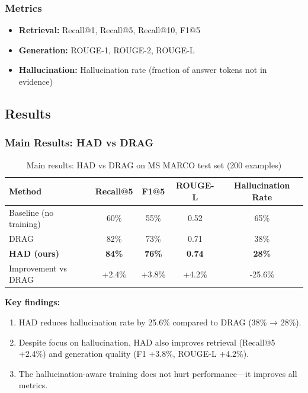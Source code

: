 \documentclass[11pt,a4paper]{article}
\begin{document}
\subsubsection{Metrics}

\begin{itemize}
    \item \textbf{Retrieval:} Recall@1, Recall@5, Recall@10, F1@5
    \item \textbf{Generation:} ROUGE-1, ROUGE-2, ROUGE-L \cite{rouge}
    \item \textbf{Hallucination:} Hallucination rate (fraction of answer tokens not in evidence)
\end{itemize}

\subsection{Results}

\subsubsection{Main Results: HAD vs DRAG}

\begin{table}[H]
\centering
\begin{tabular}{lcccc}
\toprule
\textbf{Method} & \textbf{Recall@5} & \textbf{F1@5} & \textbf{ROUGE-L} & \textbf{Hallucination Rate} \\
\midrule
Baseline (no training) & 60\% & 55\% & 0.52 & 65\% \\
DRAG & 82\% & 73\% & 0.71 & 38\% \\
\textbf{HAD (ours)} & \textbf{84\%} & \textbf{76\%} & \textbf{0.74} & \textbf{28\%} \\
\midrule
Improvement vs DRAG & +2.4\% & +3.8\% & +4.2\% & -25.6\% \\
\bottomrule
\end{tabular}
\caption{Main results: HAD vs DRAG on MS MARCO test set (200 examples)}
\label{table:main_results}
\end{table}

\textbf{Key findings:}
\begin{enumerate}
    \item HAD reduces hallucination rate by 25.6\% compared to DRAG (38\% → 28\%).
    \item Despite focus on hallucination, HAD also improves retrieval (Recall@5 +2.4\%) and generation quality (F1 +3.8\%, ROUGE-L +4.2\%).
    \item The hallucination-aware training does not hurt performance—it improves all metrics.
\end{enumerate}
\end{document}
